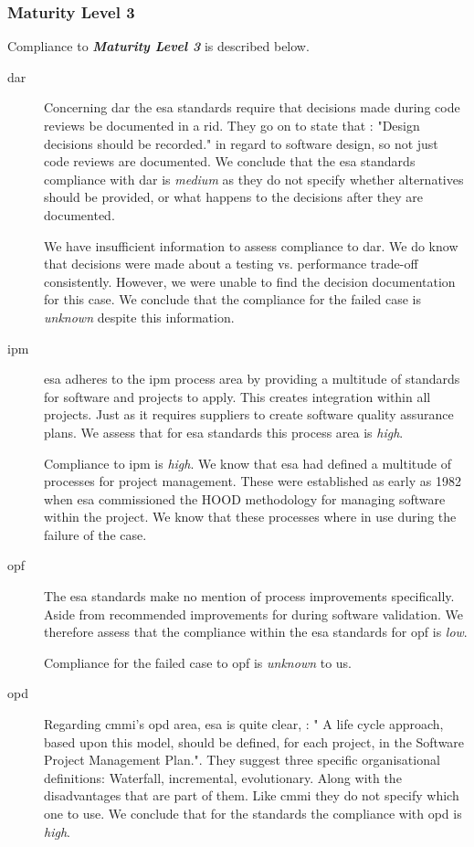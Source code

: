 \subsubsection{Maturity Level 3}
Compliance to \textbf{\textit{Maturity Level 3}} is described below.

\begin{description}
\item[\ac{dar}]
Concerning \ac{dar} the \ac{esa} standards require that decisions made during code reviews be documented in a \ac{rid}. They go on to state that \citep[44]{esaSEstandards1991}: "Design decisions should be recorded." in regard to software design, so not just code reviews are documented.
We conclude that the \ac{esa} standards compliance with \ac{dar} is \textit{medium} as they do not specify whether alternatives should be provided, or what happens to the decisions after they are documented.

We have insufficient information to assess compliance to \ac{dar}. We do know that decisions were made about a testing vs. performance trade-off consistently. However, we were unable to find the decision documentation for this case. We conclude that the compliance for the failed case is \textit{unknown} despite this information. 

\item[\ac{ipm}]
\ac{esa} adheres to the \ac{ipm} process area by providing a multitude of standards for software and projects to apply. This creates integration within all projects. Just as it requires suppliers to create software quality assurance plans.
We assess that for \ac{esa} standards this process area is \textit{high}.

Compliance to \ac{ipm} is \textit{high}. We know that \ac{esa} had defined a multitude of processes for project management. These were established as early as 1982 when \ac{esa} commissioned the HOOD methodology for managing software within the project. We know that these processes where in use during the failure of the case.

\item[\ac{opf}]
The \ac{esa} standards make no mention of process improvements specifically. Aside from recommended improvements for during software validation. We therefore assess that the compliance within the \ac{esa} standards for \ac{opf} is \textit{low}.

Compliance for the failed case to \ac{opf} is \textit{unknown} to us. 

\item[\ac{opd}]
Regarding \ac{cmmi}'s \ac{opd} area, \ac{esa} is quite clear, \citep[22]{esaSEstandards1991}: " A life cycle approach, based upon this model, should be defined, for each project, in the Software Project Management Plan.". They suggest three specific organisational definitions: Waterfall, incremental, evolutionary. Along with the disadvantages that are part of them. Like \ac{cmmi} they do not specify which one to use. We conclude that for the standards the compliance with \ac{opd} is \textit{high}.


\end{description}
